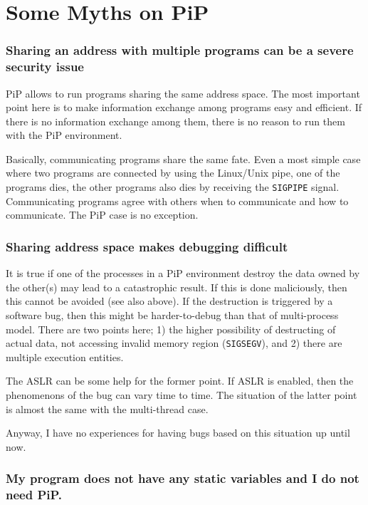 
\section{Some Myths on PiP}

\subsubsection*{Sharing an address with multiple programs can be a
  severe security issue}\label{sec:security-issue}

PiP allows to run programs sharing the same address space. The
most important point here is to make information exchange among
programs easy and efficient. If there is no information exchange among
them, there is no reason to run them with the PiP environment.

Basically, communicating programs share the same fate. Even a most
simple case where two programs are connected by using the Linux/Unix
pipe, one of the programs dies, the other programs also dies by
receiving the {\tt SIGPIPE} signal. Communicating programs agree with
others when to communicate and how to communicate. The PiP case is no
exception.

\subsubsection*{Sharing address space makes debugging difficult}

It is true if one of the processes in a PiP environment destroy the
data owned by the other(s) may lead to a catastrophic result. If this
is done maliciously, then this cannot be avoided (see also
above). If the destruction is triggered by a
software bug, then this might be harder-to-debug than that of
multi-process model.  There are two points here; 1) the higher 
possibility of destructing of actual data, not accessing invalid memory
region ({\tt SIGSEGV}), and 2) there are multiple execution entities.

The ASLR can be some help for the former point. If ASLR is enabled,
then the phenomenons of the bug can vary time to time. The situation
of the latter point is almost the same with the multi-thread case.

Anyway, I have no experiences for having bugs based on this situation
up until now. 

\subsubsection*{My program does not have any static variables and I do
  not need PiP.}

